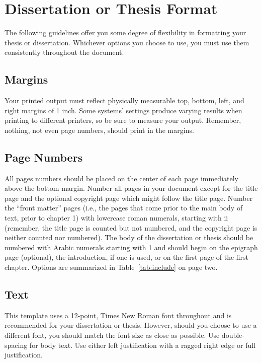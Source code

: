
\chapter{Dissertation or Thesis Format}
\label{ch:2}

The following guidelines offer you some degree of flexibility in formatting your thesis or dissertation.
Whichever options you choose to use, you must use them consistently throughout the document.

\section{Margins}

Your printed output must reflect physically measurable top, bottom, left, and right margins of 1 inch.
Some systems' settings produce varying results when printing to different printers, so be sure to measure your output.
Remember, nothing, not even page numbers, should print in the margins.

\section{Page Numbers}

All pages numbers should be placed on the center of each page immediately above the bottom margin.
Number all pages in your document except for the title page and the optional copyright page which might follow the title page.
Number the ``front matter'' pages (i.e., the pages that come prior to the main body of text, prior to chapter 1) with lowercase roman numerals, starting with ii (remember, the title page is counted but not numbered, and the copyright page is neither counted nor numbered).
The body of the dissertation or thesis should be numbered with Arabic numerals starting with 1 and should begin on the epigraph page (optional), the introduction, if one is used, or on the first page of the first chapter.
Options are summarized in Table~\ref{tab:include} on page two.

\section{Text}

This template uses a 12-point, Times New Roman font throughout and is recommended for your dissertation or thesis.
However, should you choose to use a different font, you should match the font size as close as possible.
Use double-spacing for body text.
Use either left justification with a ragged right edge or full justification.

